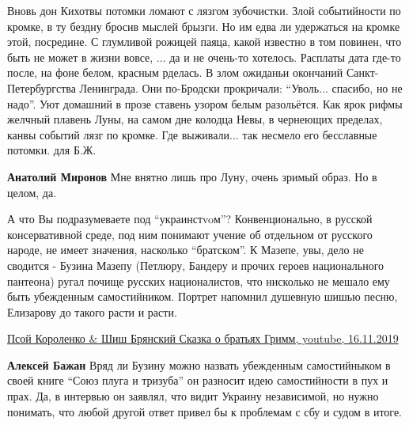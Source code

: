  
 
 
 
 
\zzSecCmt

\begin{itemize} %

\begin{multicols}{2} %
\obeycr
Вновь дон Кихотвы потомки
ломают с лязгом зубочистки.
Злой событийности по кромке,
в ту бездну бросив мыслей брызги.
\smallskip
Но им едва ли удержаться
на кромке этой, посредине.
С глумливой рожицей паяца,
какой известно в том повинен,
\smallskip
что быть не может в жизни вовсе,
... да и не очень-то хотелось.
Расплаты дата где-то после,
на фоне белом, красным рделась.
\smallskip
В злом ожиданьи окончаний
Санкт-Петербургства Ленинграда.
Они по-Бродски прокричали:
\enquote{Уволь... спасибо, но не надо}.
\smallskip
Уют домашний в прозе ставень
узором белым разольётся.
Как ярок рифмы желчный плавень
Луны, на самом дне колодца
\smallskip
Невы, в чернеющих пределах,
канвы событий лязг по кромке.
Где выживали... так несмело
его бесславные потомки.
\smallskip
для Б.Ж.
\restorecr
\end{multicols} %

\textbf{Анатолий Миронов} Мне внятно лишь про Луну, очень зримый образ. Но в целом, да.


А что Вы подразумеваете под \enquote{украинстvoм}? Конвенционально, в русской
консервативной среде, под ним понимают учение об отдельном от русского народе,
не имеет значения, насколько \enquote{братском}. К Мазепе, увы, дело не сводится -
Бузина Мазепу (Петлюру, Бандеру и прочих героев национального пантеона) ругал
почище русских националистов, что нисколько не мешало ему быть убежденным
самостийником. Портрет напомнил душевную шишью песню, Елизарову до такого расти
и расти. 

\href{https://www.youtube.com/watch?v=VSZM26b2YcY}{%
Псой Короленко \& Шиш Брянский Сказка о братьях Гримм, youtube, 16.11.2019%
}

\begin{itemize} %
\textbf{Алексей Бажан} Вряд ли Бузину можно назвать убежденным самостийныком в своей книге \enquote{Союз плуга и тризуба} он разносит идею самостийности в пух и прах. Да, в интервью он заявлял, что видит Украину независимой, но нужно понимать, что любой другой ответ привел бы к проблемам с сбу и судом в итоге.


\end{itemize}
\end{itemize}
